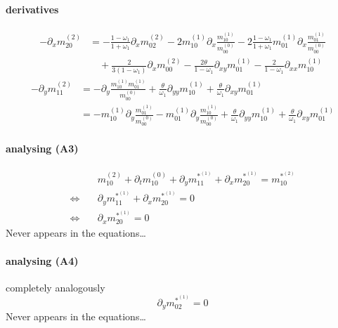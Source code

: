 \documentclass{article}
\begin{document}
  \paragraph{derivatives}
  \begin{equation}
    \tag{C5}
    \begin{aligned}
      - \partial_x m_{20}^{(2)} &=
      - \frac{1-\omega_1}{1+\omega_1} \partial_x m_{02}^{(2)}
      - 2 m_{10}^{(1)} \partial_x \frac{ m_{10}^{(1)} }{m_{00}^{(0)}}
      - 2 \frac{1-\omega_1}{1+\omega_1} m_{01}^{(1)}\partial_x\frac{m_{01}^{(1)}}{m_{00}^{(0)}}
      \\&\quad
      + \frac{ 2}{3(1-\omega_1)} \partial_x m_{00}^{(2)}
      - \frac{2\theta}{1-\omega_1}\partial_{xy} m_{01}^{(1)}
      - \frac{2}{1-\omega_1}\partial_{xx} m_{10}^{(1)}
    \end{aligned}
  \end{equation}
  \begin{equation}
    \tag{C6}
    \begin{aligned}
    -\partial_y m_{11}^{(2)} &=  -\partial_y \frac{ m_{10}^{(1)}m_{01}^{(1)}}{m_{00}^{(0)}}
    + \frac{\theta}{\omega_1}\partial_{yy} m_{10}^{(1)} + \frac{\theta}{\omega_1}\partial_{xy} m_{01}^{(1)}
    \\&=
    -m_{10}^{(1)}\partial_y \frac{ m_{01}^{(1)}}{m_{00}^{(0)}}
    -m_{01}^{(1)}\partial_y \frac{ m_{10}^{(1)}}{m_{00}^{(0)}}
    + \frac{\theta}{\omega_1}\partial_{yy} m_{10}^{(1)}
    + \frac{\theta}{\omega_1}\partial_{xy} m_{01}^{(1)}
    \end{aligned}
  \end{equation}

  \paragraph{analysing (A3)}
  \begin{align*}
    &m_{10}^{(2)} + \partial_t m_{10}^{(0)} + \partial_y m_{11}^{*^{(1)}} + \partial_x m_{20}^{*^{(1)}} = m_{10}^{*^{(2)}}
    \\ \Leftrightarrow \quad &
    \partial_y m_{11}^{*^{(1)}} + \partial_x m_{20}^{*^{(1)}} = 0
    \\ \Leftrightarrow \quad &
    \partial_x m_{20}^{*^{(1)}} = 0
  \end{align*}
  Never appears in the equations\ldots
  \paragraph{analysing (A4)} completely analogously
  \begin{equation*}
    \partial_y m_{02}^{*^{(1)}} = 0
  \end{equation*}
  Never appears in the equations\ldots
\end{document}

